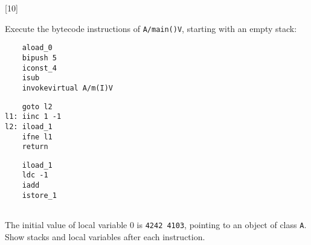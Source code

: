 [10]
\droptotalpoints

Execute the bytecode instructions of \Verb+A/main()V+, starting with an empty stack:
\begin{center}
\begin{minipage}[t]{5cm} 
\begin{Verbatim}
    aload_0
    bipush 5
    iconst_4
    isub
    invokevirtual A/m(I)V
\end{Verbatim}
\end{minipage}\hspace{1cm}
\begin{minipage}[t]{4cm}
\begin{Verbatim}
    goto l2
l1: iinc 1 -1
l2: iload_1
    ifne l1
    return
\end{Verbatim}
\end{minipage}\hspace{1cm}
\begin{minipage}[t]{4cm}
\begin{Verbatim}
    iload_1 
    ldc -1 
    iadd 
    istore_1
    
\end{Verbatim}
\end{minipage}
 \end{center}

The initial value of local variable 0 is \Verb+4242 4103+, pointing to an object of class \Verb+A+.
Show stacks and local variables after each instruction. 

